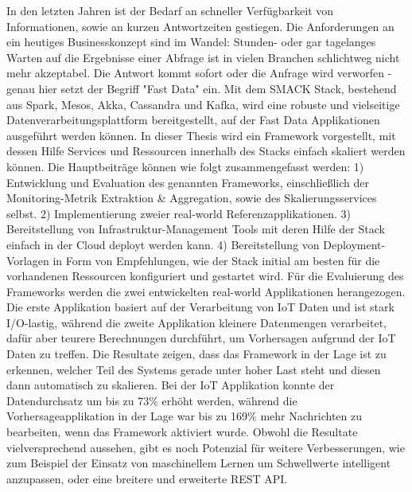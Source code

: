 \documentclass[draft,final]{vutinfth} %
\begin{document}
\begin{kurzfassung}
In den letzten Jahren ist der Bedarf an schneller Verfügbarkeit von Informationen, sowie an kurzen Antwortzeiten gestiegen.
Die Anforderungen an ein heutiges Businesskonzept sind im Wandel: Stunden- oder gar tagelanges Warten auf die Ergebnisse einer Abfrage ist in vielen Branchen schlichtweg nicht mehr akzeptabel.
Die Antwort kommt sofort oder die Anfrage wird verworfen - genau hier setzt der Begriff "Fast Data" ein.
Mit dem SMACK Stack, bestehend aus Spark, Mesos, Akka, Cassandra und Kafka, wird eine robuste und vielseitige Datenverarbeitungsplattform bereitgestellt, auf der Fast Data Applikationen ausgeführt werden können.
In dieser Thesis wird ein Framework vorgestellt, mit dessen Hilfe Services und Ressourcen innerhalb des Stacks einfach skaliert werden können.
Die Hauptbeiträge können wie folgt zusammengefasst werden:
1) Entwicklung und Evaluation des genannten Frameworks, einschließlich der Monitoring-Metrik Extraktion \& Aggregation, sowie des Skalierungsservices selbst.
2) Implementierung zweier real-world Referenzapplikationen.
3) Bereitstellung von Infrastruktur-Management Tools mit deren Hilfe der Stack einfach in der Cloud deployt werden kann.
4) Bereitstellung von Deployment-Vorlagen in Form von Empfehlungen, wie der Stack initial am besten für die vorhandenen Ressourcen konfiguriert und gestartet wird.
Für die Evaluierung des Frameworks werden die zwei entwickelten real-world Applikationen herangezogen.
Die erste Applikation basiert auf der Verarbeitung von IoT Daten und ist stark I/O-lastig, während die zweite Applikation kleinere Datenmengen verarbeitet, dafür aber teurere Berechnungen durchführt, um Vorhersagen aufgrund der IoT Daten zu treffen.
Die Resultate zeigen, dass das Framework in der Lage ist zu erkennen, welcher Teil des Systems gerade unter hoher Last steht und diesen dann automatisch zu skalieren.
Bei der IoT Applikation konnte der Datendurchsatz um bis zu 73\% erhöht werden, während die Vorhersageapplikation in der Lage war bis zu 169\% mehr Nachrichten zu bearbeiten, wenn das Framework aktiviert wurde.
Obwohl die Resultate vielversprechend aussehen, gibt es noch Potenzial für weitere Verbesserungen, wie zum Beispiel der Einsatz von maschinellem Lernen um Schwellwerte intelligent anzupassen, oder eine breitere und erweiterte REST API.
\end{kurzfassung}
\end{document}
